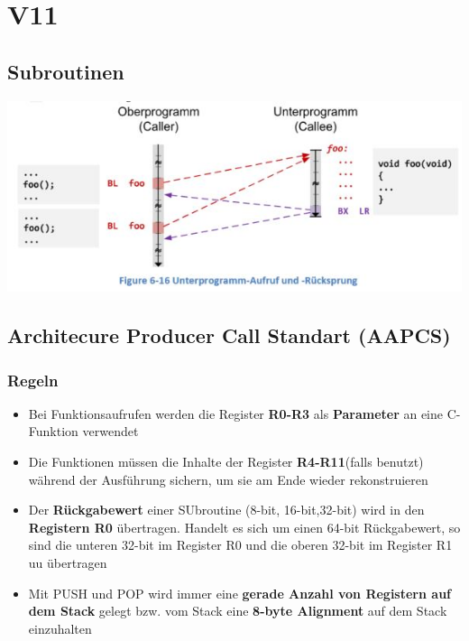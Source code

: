 \section{V11}
\subsection{Subroutinen}
\includegraphics[width=0.8\linewidth]{images/subroutinen} 

\subsection{Architecure Producer Call Standart (AAPCS)}
\subsubsection{Regeln}
\begin{itemize}
    \item Bei Funktionsaufrufen werden die Register \textbf{R0-R3} als \textbf{Parameter} an eine C-Funktion verwendet
    \item Die Funktionen müssen die Inhalte der Register \textbf{R4-R11}(falls benutzt) während der Ausführung sichern, um sie am Ende wieder rekonstruieren
    \item Der \textbf{Rückgabewert} einer SUbroutine (8-bit, 16-bit,32-bit) wird in den \textbf{Registern R0} übertragen. Handelt es sich um einen 64-bit Rückgabewert, so sind die unteren 32-bit im Register R0 und die oberen 32-bit im Register R1 uu übertragen
    \item Mit PUSH und POP wird immer eine \textbf{gerade Anzahl von Registern auf dem Stack} gelegt bzw. vom Stack eine \textbf{8-byte Alignment} auf dem Stack einzuhalten
\end{itemize}